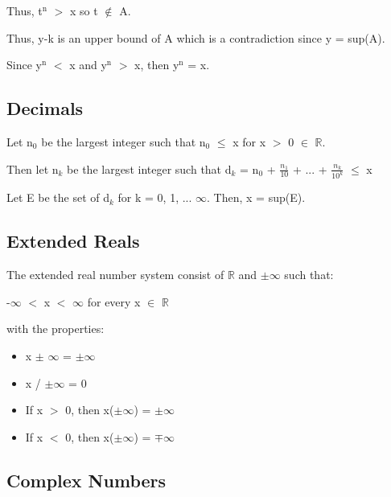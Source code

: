 	\qquad Thus, t$^\text{n}$ $>$ x so t $\not \in$ A.

	\qquad Thus, y-k is an upper bound of A which is a contradiction since y = sup(A).

	Since y$^\text{n}$ $<$ x and y$^\text{n}$ $>$ x, then y$^\text{n}$ = x. 

\newpage





\subsection{Decimals}

	Let n$_0$ be the largest integer such that n$_0$ $\leq$ x for x $>$ 0 $\in$ $\mathbb{R}$.

	Then let n$_k$ be the largest integer such that
	d$_k$ = n$_0$ + $\frac{n_1}{10}$ + ... + $\frac{n_k}{10^k}$ $\leq$ x

	Let E be the set of d$_k$ for k = 0, 1, ... $\infty$. Then, x = sup(E).





\subsection{Extended Reals}

	The extended real number system consist of $\mathbb{R}$ and $\pm$$\infty$ such that:

	\qquad -$\infty$ $<$ x $<$ $\infty$	\qquad for every x $\in$ $\mathbb{R}$

	with the properties:
	\begin{itemize}[leftmargin=2cm, itemsep=0.4em]
		\item x $\pm$ $\infty$ = $\pm$$\infty$
	
		\item x / $\pm$$\infty$ = 0

		\item If x $>$ 0, then x($\pm$$\infty$) = $\pm$$\infty$

		\item If x $<$ 0, then x($\pm$$\infty$) = $\mp$$\infty$
	\end{itemize}





\subsection{Complex Numbers}

